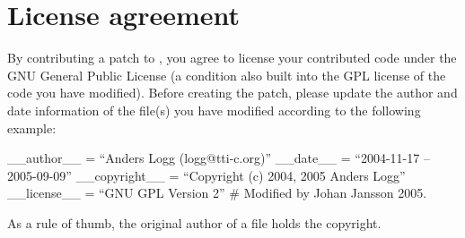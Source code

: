 

\section{License agreement}

By contributing a patch to \package{}, you agree to license your
contributed code under the GNU General Public License (a condition
also built into the GPL license of the code you have modified). Before
creating the patch, please update the author and date information of
the file(s) you have modified according to the following example:

\begin{code}
 __author__ = ``Anders Logg (logg@tti-c.org)''
 __date__ = ``2004-11-17 -- 2005-09-09''
 __copyright__ = ``Copyright (c) 2004, 2005 Anders Logg''
 __license__  = ``GNU GPL Version 2''
 # Modified by Johan Jansson 2005.
\end{code}

As a rule of thumb, the original author of a file holds the copyright.

